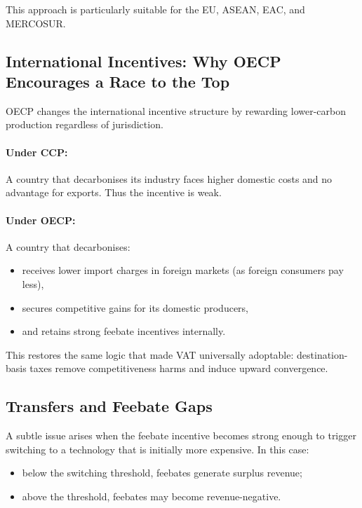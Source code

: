 \documentclass[12pt]{article}
\begin{document}
This approach is particularly suitable for the EU, ASEAN, EAC, and MERCOSUR.

\subsection{International Incentives: Why OECP Encourages a Race to the Top}

OECP changes the international incentive structure by rewarding lower-carbon
production regardless of jurisdiction.

\paragraph{Under CCP:}
A country that decarbonises its industry faces higher domestic costs and no
advantage for exports.  
Thus the incentive is weak.

\paragraph{Under OECP:}
A country that decarbonises:
\begin{itemize}
    \item receives lower import charges in foreign markets (as foreign consumers pay less),
    \item secures competitive gains for its domestic producers,
    \item and retains strong feebate incentives internally.
\end{itemize}

This restores the same logic that made VAT universally adoptable: destination-basis
taxes remove competitiveness harms and induce upward convergence.

\subsection{Transfers and Feebate Gaps}

A subtle issue arises when the feebate incentive becomes strong enough to trigger
switching to a technology that is initially more expensive.  
In this case:
\begin{itemize}
    \item below the switching threshold, feebates generate surplus revenue;
    \item above the threshold, feebates may become revenue-negative.
\end{itemize}
\end{document}
